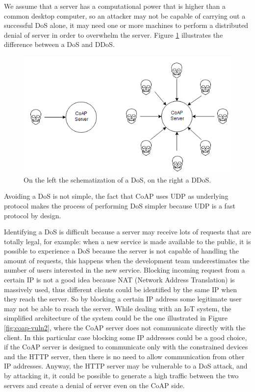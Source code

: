 	We assume that a server has a computational power that is higher than a common desktop computer, so an attacker may not be capable of carrying out a successful DoS alone, it may need one or more machines to perform a distributed denial of server in order to overwhelm the server.\newline
	Figure \ref{fig:coap-vuln1} illustrates the difference between a DoS and DDoS.
	
	\begin{figure}
		\includegraphics[width=\linewidth]{coap-vuln-img1.png}
		\caption{On the left the schematization of a DoS, on the right a DDoS.}
		\label{fig:coap-vuln1}
	\end{figure}

	Avoiding a DoS is not simple, the fact that CoAP uses UDP as underlying protocol makes the process of performing DoS simpler because UDP is a fast protocol by design.\newline
	
	Identifying a DoS is difficult because a server may receive lots of requests that are totally legal, for example: when a new service is made available to the public, it is possible to experience a DoS because the server is not capable of handling the amount of requests, this happens when the development team underestimates the number of users interested in the new service.\newline
	Blocking incoming request from a certain IP is not a good idea because NAT (Network Address Translation) is massively used, thus different clients could be identified by the same IP when they reach the server. So by blocking a certain IP address some legitimate user may not be able to reach the server.\newline
	While dealing with an IoT system, the simplified architecture of the system could be the one illustrated in Figure \ref{fig:coap-vuln2}, where the CoAP server does not communicate directly with the client. In this particular case blocking some IP addresses could be a good choice, if the CoAP server is designed to communicate only with the constrained devices and the HTTP server, then there is no need to allow communication from other IP addresses.\newline
	Anyway, the HTTP server may be vulnerable to a DoS attack, and by attacking it, it could be possible to generate a high traffic between the two servers and create a denial of server even on the CoAP side.\newline
	
